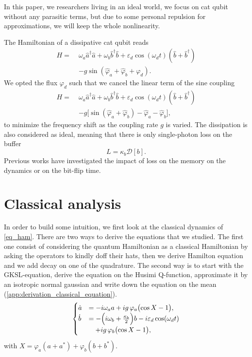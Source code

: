 \documentclass[aps,prx,reprint,floatfix,amsmath,amssymb,longbibliography]{revtex4-2}
\newcommand{\eps}{\varepsilon}
\newcommand{\da}{^\dagger}
\newcommand{\ha}{\hat{a}}
\newcommand{\hb}{\hat{b}}
\begin{document}
In this paper, we researchers living in an ideal world, we focus on cat qubit without any parasitic terms, but due to some personal repulsion for approximations, we will keep the whole nonlinearity.

The Hamiltonian of a dissipative cat qubit reads \cite{Carde2025Feb}
\begin{equation}
\begin{split}
    H =\;& \omega_a\ha\da\ha+\omega_b\hb\da\hb+\eps_d\cos(\omega_d t)(\hb+\hb\da)\\
    &-g\sin(\hat\varphi_a+\hat\varphi_b+\varphi_d).
\end{split}
\label{eq_ham_0}
\end{equation}
We opted the flux $\varphi_d$ such that we cancel the linear term of the sine coupling
\begin{equation}
\begin{split}
    H =\;& \omega_a\ha\da\ha+\omega_b\hb\da\hb+\eps_d\cos(\omega_d t)(\hb+\hb\da)\\
    &-g\bigl[\sin(\hat\varphi_a+\hat\varphi_b)-\hat\varphi_a-\hat\varphi_b\bigr],
\end{split}
\label{eq_ham}
\end{equation}
to minimize the frequency shift as the coupling rate $g$ is varied.
The dissipation is also considered as ideal, meaning that there is only single-photon loss on the buffer
\begin{equation}
    L=\kappa_b\mathcal{D}[b].
\end{equation}
Previous works have investigated the impact of loss on the memory on the dynamics\cite{Carde2025Feb} or on the bit-flip time\cite{Dubovitskii2025Jan}.

\section{Classical analysis}
\label{sec:classical_analysis}
In order to build some intuition, we first look at the classical dynamics of \cref{eq_ham}. There are two ways to derive the equations that we studied. The first one consist of considering the quantum Hamiltonian as a classical Hamiltonian by asking the operators to kindly doff their hats, then we derive Hamilton equation and we add decay on one of the quadrature.
The second way is to start with the GKSL-equation, derive the equation on the Husimi Q-function, approximate it by an isotropic normal gaussian and write down the equation on the mean (\cref{app:derivation_classical_equation}).
\begin{equation}
    \begin{cases}
        \dot a &= -i\omega_a a+ig\,\varphi_a\bigl(\cos X-1\bigr),\\
        \dot b &= -\Bigl(i\omega_b+\frac{\kappa_b}{2}\Bigr)b-i\eps_d\cos(\omega_d t)\\
        &\quad+ig\,\varphi_b\bigl(\cos X-1\bigr),
    \end{cases}
\label{eq_classical_dynamics}
\end{equation}
with $X=\varphi_a(a+a^*)+\varphi_b(b+b^*)$.
\end{document}
